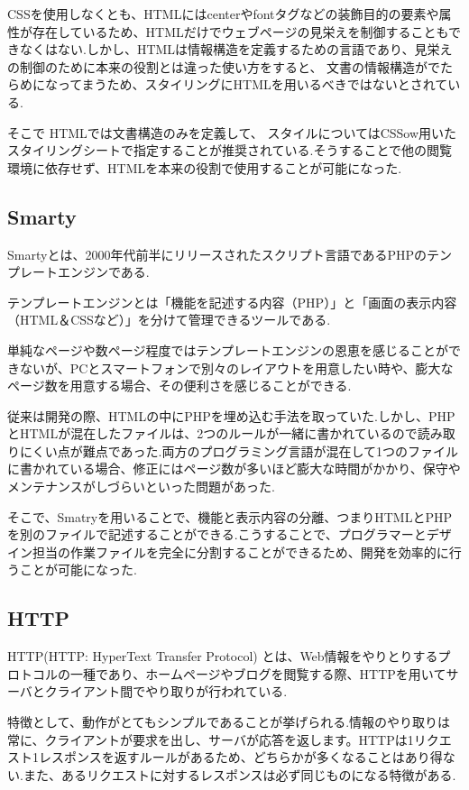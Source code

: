 \documentclass[submit,techrep]{ipsj}
\begin{document}
CSSを使用しなくとも、HTMLには\<center\>や\<font\>タグなどの装飾目的の要素や属性が存在しているため、HTMLだけでウェブページの見栄えを制御することもできなくはない.しかし、HTMLは情報構造を定義するための言語であり、見栄えの制御のために本来の役割とは違った使い方をすると、 文書の情報構造がでたらめになってまうため、スタイリングにHTMLを用いるべきではないとされている.

そこで HTMLでは文書構造のみを定義して、 スタイルについてはCSSow用いたスタイリングシートで指定することが推奨されている.そうすることで他の閲覧環境に依存せず、HTMLを本来の役割で使用することが可能になった.


\subsection{Smarty}
Smartyとは、2000年代前半にリリースされたスクリプト言語であるPHPのテンプレートエンジンである.

テンプレートエンジンとは「機能を記述する内容（PHP）」と「画面の表示内容（HTML＆CSSなど）」を分けて管理できるツールである.

単純なページや数ページ程度ではテンプレートエンジンの恩恵を感じることができないが、PCとスマートフォンで別々のレイアウトを用意したい時や、膨大なページ数を用意する場合、その便利さを感じることができる.

従来は開発の際、HTMLの中にPHPを埋め込む手法を取っていた.しかし、PHPとHTMLが混在したファイルは、2つのルールが一緒に書かれているので読み取りにくい点が難点であった.両方のプログラミング言語が混在して1つのファイルに書かれている場合、修正にはページ数が多いほど膨大な時間がかかり、保守やメンテナンスがしづらいといった問題があった.

そこで、Smatryを用いることで、機能と表示内容の分離、つまりHTMLとPHPを別のファイルで記述することができる.こうすることで、プログラマーとデザイン担当の作業ファイルを完全に分割することができるため、開発を効率的に行うことが可能になった.

\subsection{HTTP}
HTTP(HTTP: HyperText Transfer Protocol) とは、Web情報をやりとりするプロトコルの一種であり、ホームページやブログを閲覧する際、HTTPを用いてサーバとクライアント間でやり取りが行われている.

特徴として、動作がとてもシンプルであることが挙げられる.情報のやり取りは常に、クライアントが要求を出し、サーバが応答を返します。HTTPは1リクエスト1レスポンスを返すルールがあるため、どちらかが多くなることはあり得ない.また、あるリクエストに対するレスポンスは必ず同じものになる特徴がある.
\end{document}

